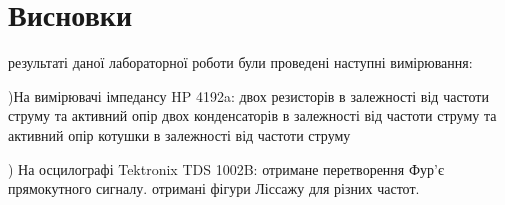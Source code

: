 \documentclass[a4paper,12pt]{article}
\begin{document}
\clearpage\section{Висновки}
\par{} результаті даної лабораторної роботи були проведені наступні вимірювання:
\par{})На вимірювачі імпедансу HP 4192a:
 двох резисторів в залежності від частоти струму
 та активний опір двох конденсаторів в залежності від частоти струму
 та активний опір котушки в залежності від частоти струму
\par{}) На осцилографі Tektronix TDS 1002B:
 отримане перетворення Фур’є прямокутного сигналу.
 отримані фігури Ліссажу для різних частот.
\end{document}

